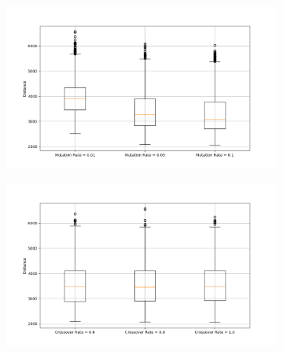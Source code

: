 \documentclass[11pt]{article}
\begin{document}
\begin{figure}[H]
    \centering
    \begin{subfigure}{0.48\textwidth}
        \includegraphics[width=\textwidth]{../results/mutation_rate_boxplot.png}
        \label{fig:m_rate}
    \end{subfigure}
    \begin{subfigure}{0.48\textwidth}
        \includegraphics[width=\textwidth]{../results/crossover_rate_boxplot.png}
        \label{fig:c_rate}
    \end{subfigure}
\end{figure}
    
\end{document}
